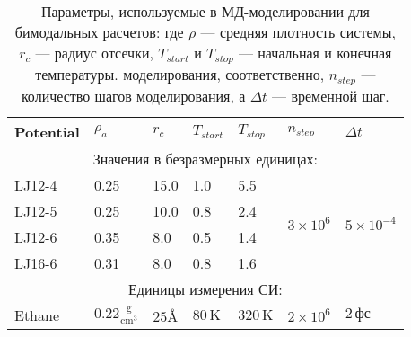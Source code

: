 \begin{table}[]
\centering
\begin{tabular}{|lllllcl|}
\hline
\multicolumn{1}{|l|}{Potential} & \multicolumn{1}{l|}{$\rho_a$} & \multicolumn{1}{l|}{$r_c$} & \multicolumn{1}{l|}{$T_{start}$} & \multicolumn{1}{l|}{$T_{stop}$} & \multicolumn{1}{l|}{$n_{step}$}                       & $\Delta t$                          \\ \hline
\multicolumn{7}{|c|}{Значения в безразмерных единицах:}                                                                                                                                                                                                         \\ \hline
\multicolumn{1}{|l|}{LJ12-4}    & \multicolumn{1}{l|}{0.25}     & \multicolumn{1}{l|}{15.0}  & \multicolumn{1}{l|}{1.0}         & \multicolumn{1}{l|}{5.5}        & \multicolumn{1}{c|}{\multirow{4}{*}{$3 \times 10^6$}} & \multirow{4}{*}{$5 \times 10^{-4}$} \\ \cline{1-5}
\multicolumn{1}{|l|}{LJ12-5}    & \multicolumn{1}{l|}{0.25}     & \multicolumn{1}{l|}{10.0}  & \multicolumn{1}{l|}{0.8}         & \multicolumn{1}{l|}{2.4}        & \multicolumn{1}{c|}{}                                 &                                     \\ \cline{1-5}
\multicolumn{1}{|l|}{LJ12-6}    & \multicolumn{1}{l|}{0.35}     & \multicolumn{1}{l|}{8.0}   & \multicolumn{1}{l|}{0.5}         & \multicolumn{1}{l|}{1.4}        & \multicolumn{1}{c|}{}                                 &                                     \\ \cline{1-5}
\multicolumn{1}{|l|}{LJ16-6}    & \multicolumn{1}{l|}{0.31}     & \multicolumn{1}{l|}{8.0}   & \multicolumn{1}{l|}{0.8}         & \multicolumn{1}{l|}{1.6}        & \multicolumn{1}{c|}{}                                 &                                     \\ \hline
\multicolumn{7}{|c|}{Единицы измерения СИ:}                                                                                                                                                                                                                     \\ \hline
\multicolumn{1}{|l|}{Ethane}    & \multicolumn{1}{l|}{$0.22\mathrm{\frac{g}{cm^3}}$}     & \multicolumn{1}{l|}{$25\text{\AA}$}    & \multicolumn{1}{l|}{$80\,\mathrm{K}$}          & \multicolumn{1}{l|}{$320\,\mathrm{K}$}        & \multicolumn{1}{l|}{$2 \times 10^6$}                  & $2\,\mathrm{\text{фс}}$                                   \\ \hline
\end{tabular}
\caption{Параметры, используемые в МД-моделировании для бимодальных расчетов: где $\rho$ — средняя плотность системы, $r_c$ — радиус отсечки, $T_{start}$ и $T_{stop}$ — начальная и конечная температуры. моделирования, соответственно, $n_{step}$ — количество шагов моделирования, а $\Delta t$ — временной шаг.}
\label{MACR-Table1}
\end{table}


